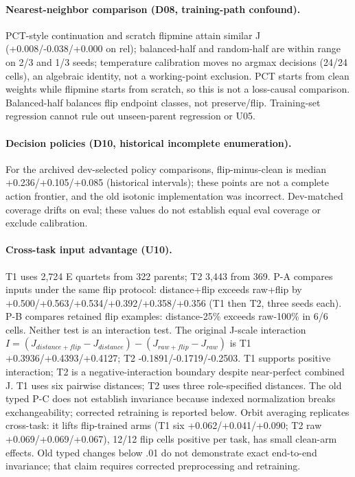 \paragraph{Nearest-neighbor comparison (D08, training-path confound).} PCT-style continuation and scratch flipmine attain similar J (+0.008/-0.038/+0.000 on rel); balanced-half and random-half are within range on 2/3 and 1/3 seeds; temperature calibration moves no argmax decisions (24/24 cells), an algebraic identity, not a working-point exclusion. PCT starts from clean weights while flipmine starts from scratch, so this is not a loss-causal comparison. Balanced-half balances flip endpoint classes, not preserve/flip. Training-set regression cannot rule out unseen-parent regression or U05.
\paragraph{Decision policies (D10, historical incomplete enumeration).} For the archived dev-selected policy comparisons, flip-minus-clean is median +0.236/+0.105/+0.085 (historical intervals); these points are not a complete action frontier, and the old isotonic implementation was incorrect. Dev-matched coverage drifts on eval; these values do not establish equal eval coverage or exclude calibration.
\paragraph{Cross-task input advantage (U10).} T1 uses 2,724 E quartets from 322 parents; T2 3,443 from 369. P-A compares inputs under the same flip protocol: distance+flip exceeds raw+flip by +0.500/+0.563/+0.534/+0.392/+0.358/+0.356 (T1 then T2, three seeds each). P-B compares retained flip examples: distance-25\% exceeds raw-100\% in 6/6 cells. Neither test is an interaction test. The original J-scale interaction $I=(J_{distance+flip}-J_{distance})-(J_{raw+flip}-J_{raw})$ is T1 +0.3936/+0.4393/+0.4127; T2 -0.1891/-0.1719/-0.2503. T1 supports positive interaction; T2 is a negative-interaction boundary despite near-perfect combined J. T1 uses six pairwise distances; T2 uses three role-specified distances. The old typed P-C does not establish invariance because indexed normalization breaks exchangeability; corrected retraining is reported below.
Orbit averaging replicates cross-task: it lifts flip-trained arms (T1 six +0.062/+0.041/+0.090; T2 raw +0.069/+0.069/+0.067), 12/12 flip cells positive per task, has small clean-arm effects. Old typed changes below .01 do not demonstrate exact end-to-end invariance; that claim requires corrected preprocessing and retraining.
